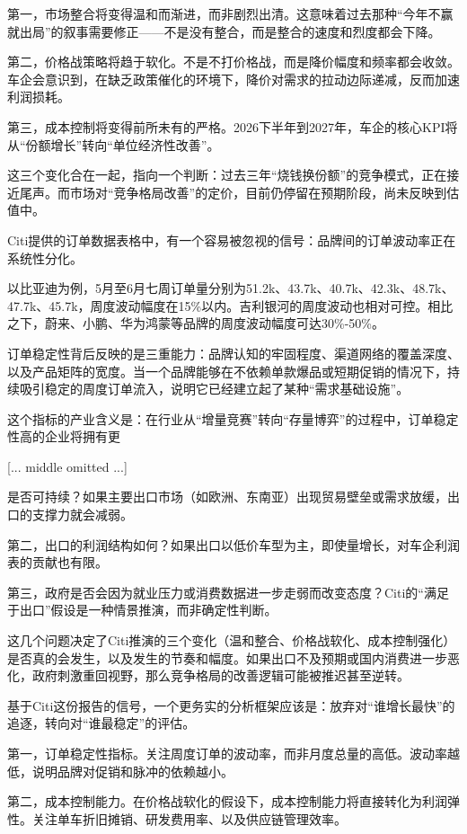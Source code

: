 \documentclass[11pt]{ctexart}
\begin{document}
第一，市场整合将变得温和而渐进，而非剧烈出清。这意味着过去那种“今年不赢就出局”的叙事需要修正——不是没有整合，而是整合的速度和烈度都会下降。

第二，价格战策略将趋于软化。不是不打价格战，而是降价幅度和频率都会收敛。车企会意识到，在缺乏政策催化的环境下，降价对需求的拉动边际递减，反而加速利润损耗。

第三，成本控制将变得前所未有的严格。2026下半年到2027年，车企的核心KPI将从“份额增长”转向“单位经济性改善”。

这三个变化合在一起，指向一个判断：过去三年“烧钱换份额”的竞争模式，正在接近尾声。而市场对“竞争格局改善”的定价，目前仍停留在预期阶段，尚未反映到估值中。

Citi提供的订单数据表格中，有一个容易被忽视的信号：品牌间的订单波动率正在系统性分化。

以比亚迪为例，5月至6月七周订单量分别为51.2k、43.7k、40.7k、42.3k、48.7k、47.7k、45.7k，周度波动幅度在15\%以内。吉利银河的周度波动也相对可控。相比之下，蔚来、小鹏、华为鸿蒙等品牌的周度波动幅度可达30\%-50\%。

订单稳定性背后反映的是三重能力：品牌认知的牢固程度、渠道网络的覆盖深度、以及产品矩阵的宽度。当一个品牌能够在不依赖单款爆品或短期促销的情况下，持续吸引稳定的周度订单流入，说明它已经建立起了某种“需求基础设施”。

这个指标的产业含义是：在行业从“增量竞赛”转向“存量博弈”的过程中，订单稳定性高的企业将拥有更

[... middle omitted ...]

是否可持续？如果主要出口市场（如欧洲、东南亚）出现贸易壁垒或需求放缓，出口的支撑力就会减弱。

第二，出口的利润结构如何？如果出口以低价车型为主，即使量增长，对车企利润表的贡献也有限。

第三，政府是否会因为就业压力或消费数据进一步走弱而改变态度？Citi的“满足于出口”假设是一种情景推演，而非确定性判断。

这几个问题决定了Citi推演的三个变化（温和整合、价格战软化、成本控制强化）是否真的会发生，以及发生的节奏和幅度。如果出口不及预期或国内消费进一步恶化，政府刺激重回视野，那么竞争格局的改善逻辑可能被推迟甚至逆转。

基于Citi这份报告的信号，一个更务实的分析框架应该是：放弃对“谁增长最快”的追逐，转向对“谁最稳定”的评估。

第一，订单稳定性指标。关注周度订单的波动率，而非月度总量的高低。波动率越低，说明品牌对促销和脉冲的依赖越小。

第二，成本控制能力。在价格战软化的假设下，成本控制能力将直接转化为利润弹性。关注单车折旧摊销、研发费用率、以及供应链管理效率。
\end{document}

